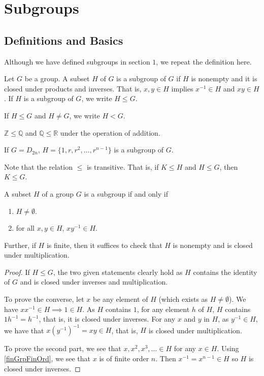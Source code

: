 \section{Subgroups}

\subsection{Definitions and Basics}
Although we have defined subgroups in section $1$, we repeat the definition here.
\begin{definition}
Let $G$ be a group. A subset $H$ of $G$ is a subgroup of $G$ if $H$ is nonempty and it is closed under products and inverses. That is, $x,y\in H$ implies $x^{-1}\in H$ and $xy\in H$. If $H$ is a subgroup of $G$, we write $H\leq G$.
\end{definition}

If $H\leq G$ and $H\neq G$, we write $H<G$.

\begin{example}
    $\mathbb{Z}\leq\mathbb{Q}$ and $\mathbb{Q}\leq\mathbb{R}$ under the operation of addition.
    
    If $G=D_{2n}$, $H=\{1,r,r^2,\ldots,r^{n-1}\}$ is a subgroup of $G$.
\end{example}

Note that the relation $\leq$ is transitive. That is, if $K\leq H$ and $H\leq G$, then $K\leq G$.

\begin{theorem}
\label{SubgroupCriterion}
A subset $H$ of a group $G$ is a subgroup if and only if
\begin{enumerate}
    \item $H\neq\emptyset$.
    \item for all $x,y\in H$, $xy^{-1}\in H$.
\end{enumerate}
Further, if $H$ is finite, then it suffices to check that $H$ is nonempty and is closed under multiplication.
\end{theorem}
\begin{proof}
    If $H\leq G$, the two given statements clearly hold as $H$ contains the identity of $G$ and is closed under inverses and multiplication.
    
    To prove the converse, let $x$ be any element of $H$ (which exists as $H\neq\emptyset$). We have $xx^{-1}\in H\implies 1\in H$. As $H$ contains $1$, for any element $h$ of $H$, $H$ contains $1h^{-1}=h^{-1}$, that is, it is closed under inverses. For any $x$ and $y$ in $H$, as $y^{-1}\in H$, we have that $x(y^{-1})^{-1}=xy\in H$, that is, $H$ is closed under multiplication.
    
    \vspace{1mm}
    To prove the second part, we see that $x,x^2,x^3,\ldots\in H$ for any $x\in H$. Using \ref{finGrpFinOrd}, we see that $x$ is of finite order $n$. Then $x^{-1}=x^{n-1}\in H$ so $H$ is closed under inverses.
\end{proof}

